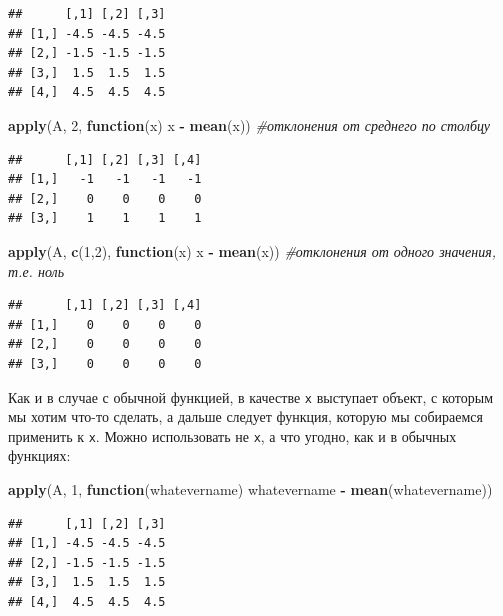 \documentclass[
]{book}
\newenvironment{Shaded}{\begin{snugshade}}{\end{snugshade}}
\newcommand{\CommentTok}[1]{\textcolor[rgb]{0.56,0.35,0.01}{\textit{#1}}}
\newcommand{\ControlFlowTok}[1]{\textcolor[rgb]{0.13,0.29,0.53}{\textbf{#1}}}
\newcommand{\DecValTok}[1]{\textcolor[rgb]{0.00,0.00,0.81}{#1}}
\newcommand{\KeywordTok}[1]{\textcolor[rgb]{0.13,0.29,0.53}{\textbf{#1}}}
\newcommand{\NormalTok}[1]{#1}
\newcommand{\OperatorTok}[1]{\textcolor[rgb]{0.81,0.36,0.00}{\textbf{#1}}}
\newcommand{\StringTok}[1]{\textcolor[rgb]{0.31,0.60,0.02}{#1}}
\begin{document}
\begin{verbatim}
##      [,1] [,2] [,3]
## [1,] -4.5 -4.5 -4.5
## [2,] -1.5 -1.5 -1.5
## [3,]  1.5  1.5  1.5
## [4,]  4.5  4.5  4.5
\end{verbatim}

\begin{Shaded}
\begin{Highlighting}[]
\KeywordTok{apply}\NormalTok{(A, }\DecValTok{2}\NormalTok{, }\ControlFlowTok{function}\NormalTok{(x) x }\OperatorTok{-}\StringTok{ }\KeywordTok{mean}\NormalTok{(x)) }\CommentTok{#отклонения от среднего по столбцу}
\end{Highlighting}
\end{Shaded}

\begin{verbatim}
##      [,1] [,2] [,3] [,4]
## [1,]   -1   -1   -1   -1
## [2,]    0    0    0    0
## [3,]    1    1    1    1
\end{verbatim}

\begin{Shaded}
\begin{Highlighting}[]
\KeywordTok{apply}\NormalTok{(A, }\KeywordTok{c}\NormalTok{(}\DecValTok{1}\NormalTok{,}\DecValTok{2}\NormalTok{), }\ControlFlowTok{function}\NormalTok{(x) x }\OperatorTok{-}\StringTok{ }\KeywordTok{mean}\NormalTok{(x)) }\CommentTok{#отклонения от одного значения, т.е. ноль}
\end{Highlighting}
\end{Shaded}

\begin{verbatim}
##      [,1] [,2] [,3] [,4]
## [1,]    0    0    0    0
## [2,]    0    0    0    0
## [3,]    0    0    0    0
\end{verbatim}

Как и в случае с обычной функцией, в качестве \texttt{x} выступает объект, с которым мы хотим что-то сделать, а дальше следует функция, которую мы собираемся применить к \texttt{х}. Можно использовать не \texttt{х}, а что угодно, как и в обычных функциях:

\begin{Shaded}
\begin{Highlighting}[]
\KeywordTok{apply}\NormalTok{(A, }\DecValTok{1}\NormalTok{, }\ControlFlowTok{function}\NormalTok{(whatevername) whatevername }\OperatorTok{-}\StringTok{ }\KeywordTok{mean}\NormalTok{(whatevername))}
\end{Highlighting}
\end{Shaded}

\begin{verbatim}
##      [,1] [,2] [,3]
## [1,] -4.5 -4.5 -4.5
## [2,] -1.5 -1.5 -1.5
## [3,]  1.5  1.5  1.5
## [4,]  4.5  4.5  4.5
\end{verbatim}
\end{document}

